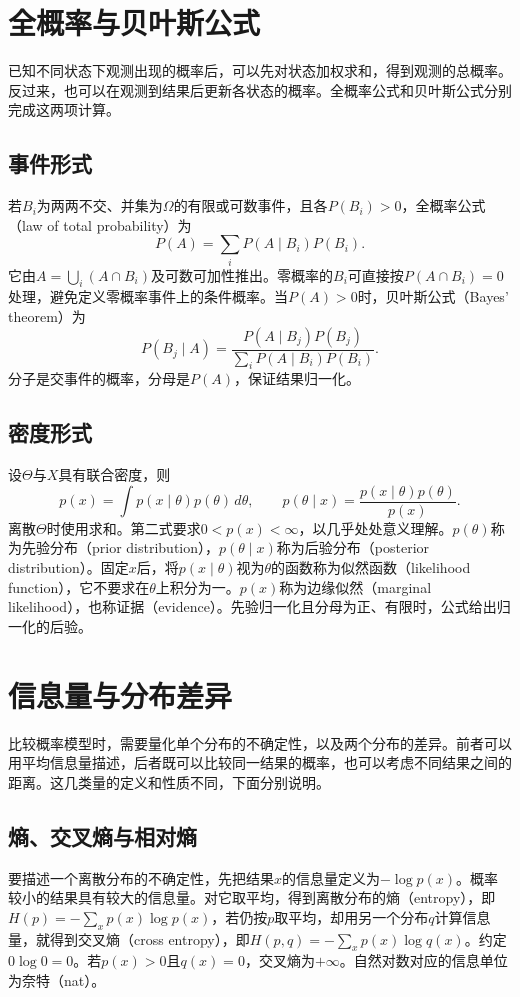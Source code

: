\section{全概率与贝叶斯公式}
已知不同状态下观测出现的概率后，可以先对状态加权求和，得到观测的总概率。反过来，也可以在观测到结果后更新各状态的概率。全概率公式和贝叶斯公式分别完成这两项计算。
\subsection{事件形式}
若$B_i$为两两不交、并集为$\Omega$的有限或可数事件，且各$P(B_i)>0$，全概率公式（law of total probability）为
\begin{equation}
 P(A)=\sum_iP(A\mid B_i)P(B_i).
\end{equation}
它由$A=\bigcup_i(A\cap B_i)$及可数可加性推出。零概率的$B_i$可直接按$P(A\cap B_i)=0$处理，避免定义零概率事件上的条件概率。当$P(A)>0$时，贝叶斯公式（Bayes' theorem）为
\begin{equation}
 P(B_j\mid A)=\frac{P(A\mid B_j)P(B_j)}{\sum_iP(A\mid B_i)P(B_i)}.
\end{equation}
分子是交事件的概率，分母是$P(A)$，保证结果归一化。

\subsection{密度形式}
设$\Theta$与$X$具有联合密度，则
\begin{equation}
 p(x)=\int p(x\mid\theta)p(\theta)\,d\theta,\qquad
 p(\theta\mid x)=\frac{p(x\mid\theta)p(\theta)}{p(x)}.
\end{equation}
离散$\Theta$时使用求和。第二式要求$0<p(x)<\infty$，以几乎处处意义理解。$p(\theta)$称为先验分布（prior distribution），$p(\theta\mid x)$称为后验分布（posterior distribution）。固定$x$后，将$p(x\mid\theta)$视为$\theta$的函数称为似然函数（likelihood function），它不要求在$\theta$上积分为一。$p(x)$称为边缘似然（marginal likelihood），也称证据（evidence）。先验归一化且分母为正、有限时，公式给出归一化的后验。

\section{信息量与分布差异}
比较概率模型时，需要量化单个分布的不确定性，以及两个分布的差异。前者可以用平均信息量描述，后者既可以比较同一结果的概率，也可以考虑不同结果之间的距离。这几类量的定义和性质不同，下面分别说明。

\subsection{熵、交叉熵与相对熵}
要描述一个离散分布的不确定性，先把结果$x$的信息量定义为$-\log p(x)$。概率较小的结果具有较大的信息量。对它取平均，得到离散分布的熵（entropy），即$H(p)=-\sum_xp(x)\log p(x)$，若仍按$p$取平均，却用另一个分布$q$计算信息量，就得到交叉熵（cross entropy），即$H(p,q)=-\sum_xp(x)\log q(x)$。约定$0\log0=0$。若$p(x)>0$且$q(x)=0$，交叉熵为$+\infty$。自然对数对应的信息单位为奈特（nat）。

